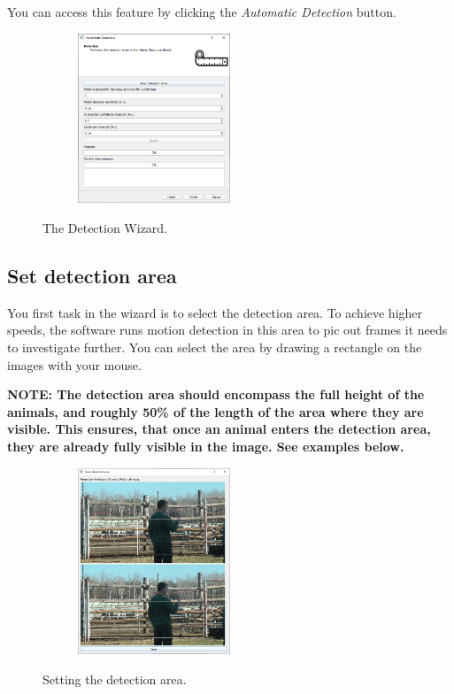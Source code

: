 \documentclass[10pt,a4paper,oneside]{report}             %
\begin{document}
You can access this feature by clicking the \textit{Automatic Detection} button.

\begin{figure}[H]
	\centering
	\begin{subfigure}{\textwidth}
		\centering 
		\includegraphics[width=0.5\textwidth]{./images/AutoDetect.png}
	\end{subfigure}
	\caption[]
	{\small  The Detection Wizard.}
\end{figure} 

\subsection{Set detection area}

You first task in the wizard is to select the detection area. To achieve higher speeds, the software runs motion detection in this area to pic out frames it needs to investigate further. You can select the area by drawing a rectangle on the images with your mouse. 

\textbf{NOTE: The detection area should encompass the full height of the animals, and roughly 50\% of the length of the area where they are visible. This ensures, that once an animal enters the detection area, they are already fully visible in the image. See examples below.}

\begin{figure}[H]
	\centering
	\begin{subfigure}{\textwidth}
		\centering 
		\includegraphics[width=0.5\textwidth]{./images/DetArea.png}
	\end{subfigure}
	\caption[]
	{\small  Setting the detection area.}
\end{figure} 
\end{document}
